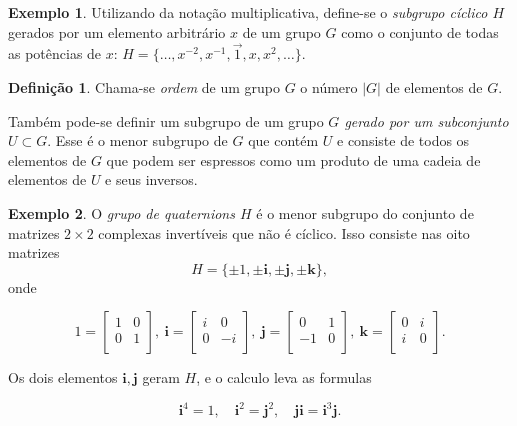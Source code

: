 \documentclass[a4paper,12pt]{report}
\theoremstyle{plain}
\theoremstyle{definition}
\newtheorem{definicao}{Definição}[section]
\newtheorem{exemplo}{Exemplo}[section]
\begin{document}
\begin{exemplo}
	Utilizando da notação multiplicativa, define-se o
	\emph{subgrupo cíclico \(H\)} gerados por um elemento arbitrário \(x\)
	de um grupo \(G\) como o conjunto de todas as potências de \(x\):
	\(H = \{\dots , x^{-2}, x^{-1},\vec{1},x,x^2,\dots\}\).
\end{exemplo}

\begin{definicao}
	Chama-se \emph{ordem} de um grupo \(G\) o número \(|G|\) de elementos de \(G\).
\end{definicao}

Também pode-se definir um subgrupo de um grupo \emph{\(G\) gerado por um
subconjunto \(U \subset G\)}. Esse é o menor subgrupo de \(G\) que
contém \(U\) e consiste de todos os elementos de \(G\) que podem ser
espressos como um produto de uma cadeia de elementos de \(U\) e seus
inversos.

\begin{exemplo}
	O \emph{grupo de quaternions \(H\)} é o menor subgrupo
	do conjunto de matrizes \(2\times 2\) complexas invertíveis que não é
	cíclico. Isso consiste nas oito matrizes
	\[H = \{\pm 1, \pm \mathbf{i}, \pm \mathbf{j}, \pm \mathbf{k}\},\] onde
	
	\[
	1=
	\begin{bmatrix}
		1 & 0 \\
		0 & 1 \\
	\end{bmatrix},
	\ \mathbf{i}=
	\begin{bmatrix}
		i & 0 \\
		0 & -i \\
	\end{bmatrix},
	\ \mathbf{j}=
	\begin{bmatrix}
		0 & 1 \\
		-1 & 0 \\
	\end{bmatrix},
	\ \mathbf{k}=
	\begin{bmatrix}
		0 & i \\
		i & 0 \\
	\end{bmatrix}.
	\]
	
	Os dois elementos \(\mathbf{i}, \mathbf{j}\) geram \(H\), e o calculo
	leva as formulas
	
	\[\mathbf{i}^4 = 1, \quad \mathbf{i}^2 = \mathbf{j}^2, \quad \mathbf{j}\mathbf{i} = \mathbf{i}^3\mathbf{j}.\]
\end{exemplo}
\end{document}
